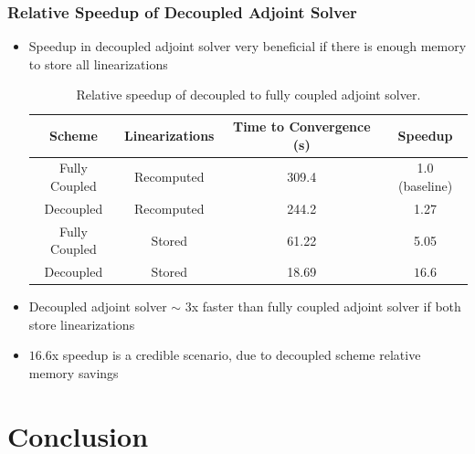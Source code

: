 \documentclass{beamer}
\begin{document}
\begin{frame}
  \frametitle{Relative Speedup of Decoupled Adjoint Solver}
\begin{itemize}
  \item Speedup in decoupled adjoint solver very beneficial if there is enough
    memory to store all linearizations
\begin{table}[h]
  \tiny
  \centering
  \begin{tabular}{c|c|c|c}
    Scheme & Linearizations & Time to Convergence (s) & Speedup \\
    \hline
    Fully Coupled & Recomputed  & 309.4 & 1.0 (baseline)\\
    Decoupled     & Recomputed  & 244.2 & 1.27 \\
    Fully Coupled & Stored      & 61.22 & 5.05 \\
    Decoupled     & Stored      & 18.69 & $\mathbf{16.6}$ \\
  \end{tabular}
  \caption{Relative speedup of decoupled to fully coupled adjoint solver.}
  \label{tab:srp-rel-speedup}
\end{table}
  \item Decoupled adjoint solver $\sim$ 3x faster than fully coupled adjoint
    solver if both store linearizations
  \item $16.6$x speedup is a credible scenario, due to decoupled scheme relative
    memory savings
\end{itemize}
\end{frame}

\section{Conclusion}
\end{document}
